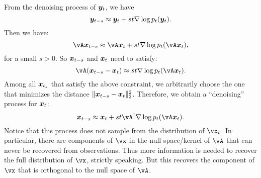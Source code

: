 \documentclass[../../book-main.tex]{subfiles}
\begin{document}
From the denoising process of $\bm{y}_t$, we have
\begin{equation}
    \bm{y}_{t-s} \approx  \bm{y}_t + st \nabla \log p_t(\bm{y}_t).
\end{equation}
Then we have:
\begin{equation}
    \vA\x_{t-s} \approx   \vA\x_t + st \nabla \log p_t(\vA \x_t),
\end{equation}
for a small $s >0$. So $\bm{x}_{t-s}$ and $\bm{x}_t$ need to satisfy:
\begin{equation}
    \vA(\x_{t-s} - \x_t) \approx st \nabla \log p_t(\vA\x_t). 
\end{equation}
Among all $\bm{x}_{t_s}$ that satisfy the above constraint, we arbitrarily choose the one that minimizes the distance $\|\bm{x}_{t-s} - \bm{x}_t\|_2^2$. Therefore, we obtain a ``denoising'' process for $\bm{x}_t$:
\begin{equation}
    \x_{t-s}  \approx \x_t + st\vA^\dagger \nabla \log p_t(\vA\x_t). 
\label{eqn:denoising-projection}
\end{equation}
Notice that this process does not sample from the distribution of $\vx_t$. In particular, there are components of $\vx$ in the null space/kernel of $\vA$ that can never be recovered from observations. Thus more information is needed to recover the full distribution of $\vx$, strictly speaking. But this recovers the component of $\vx$ that is orthogonal to the null space of $\vA$.
\end{document}
